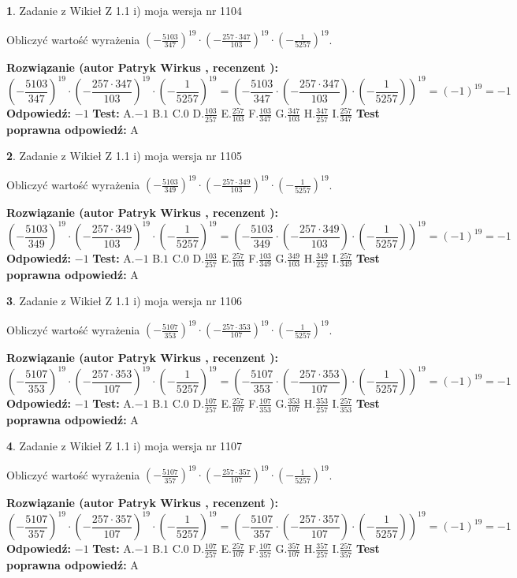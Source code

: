 \documentclass[12pt, a4paper]{article}
\theoremstyle{definition} %
\newtheorem{zad}{}
\newcommand{\zadStart}[1]{\begin{zad}#1\newline}
\newcommand{\zadStop}{\end{zad}}
\newcommand{\rozwStart}[2]{\noindent \textbf{Rozwiązanie (autor #1 , recenzent #2): }\newline}
\newcommand{\rozwStop}{\newline}
\newcommand{\odpStart}{\noindent \textbf{Odpowiedź:}\newline}
\newcommand{\odpStop}{\newline}
\newcommand{\testStart}{\noindent \textbf{Test:}\newline}
\newcommand{\testStop}{\newline}
\newcommand{\kluczStart}{\noindent \textbf{Test poprawna odpowiedź:}\newline}
\newcommand{\kluczStop}{\newline}
\begin{document}
\zadStart{Zadanie z Wikieł Z 1.1 i) moja wersja nr 1104}

Obliczyć wartość wyrażenia $(-\frac{5103}{347})^{19} \cdot (-\frac{257 \cdot 347}{103})^{19} \cdot (-\frac{1}{5257})^{19}$.
\zadStop
\rozwStart{Patryk Wirkus}{}
$$(-\frac{5103}{347})^{19} \cdot (-\frac{257 \cdot 347}{103})^{19} \cdot (-\frac{1}{5257})^{19} = (-\frac{5103}{347} \cdot (-\frac{257 \cdot 347}{103}) \cdot (-\frac{1}{5257}))^{19} = (-1)^{19} = -1$$
\rozwStop
\odpStart
$-1$
\odpStop
\testStart
A.$-1$ B.$1$ C.$0$ D.$\frac{103}{257}$ E.$\frac{257}{103}$
F.$\frac{103}{347}$ G.$\frac{347}{103}$
H.$\frac{347}{257}$
I.$\frac{257}{347}$
\testStop
\kluczStart
A
\kluczStop



\zadStart{Zadanie z Wikieł Z 1.1 i) moja wersja nr 1105}

Obliczyć wartość wyrażenia $(-\frac{5103}{349})^{19} \cdot (-\frac{257 \cdot 349}{103})^{19} \cdot (-\frac{1}{5257})^{19}$.
\zadStop
\rozwStart{Patryk Wirkus}{}
$$(-\frac{5103}{349})^{19} \cdot (-\frac{257 \cdot 349}{103})^{19} \cdot (-\frac{1}{5257})^{19} = (-\frac{5103}{349} \cdot (-\frac{257 \cdot 349}{103}) \cdot (-\frac{1}{5257}))^{19} = (-1)^{19} = -1$$
\rozwStop
\odpStart
$-1$
\odpStop
\testStart
A.$-1$ B.$1$ C.$0$ D.$\frac{103}{257}$ E.$\frac{257}{103}$
F.$\frac{103}{349}$ G.$\frac{349}{103}$
H.$\frac{349}{257}$
I.$\frac{257}{349}$
\testStop
\kluczStart
A
\kluczStop



\zadStart{Zadanie z Wikieł Z 1.1 i) moja wersja nr 1106}

Obliczyć wartość wyrażenia $(-\frac{5107}{353})^{19} \cdot (-\frac{257 \cdot 353}{107})^{19} \cdot (-\frac{1}{5257})^{19}$.
\zadStop
\rozwStart{Patryk Wirkus}{}
$$(-\frac{5107}{353})^{19} \cdot (-\frac{257 \cdot 353}{107})^{19} \cdot (-\frac{1}{5257})^{19} = (-\frac{5107}{353} \cdot (-\frac{257 \cdot 353}{107}) \cdot (-\frac{1}{5257}))^{19} = (-1)^{19} = -1$$
\rozwStop
\odpStart
$-1$
\odpStop
\testStart
A.$-1$ B.$1$ C.$0$ D.$\frac{107}{257}$ E.$\frac{257}{107}$
F.$\frac{107}{353}$ G.$\frac{353}{107}$
H.$\frac{353}{257}$
I.$\frac{257}{353}$
\testStop
\kluczStart
A
\kluczStop



\zadStart{Zadanie z Wikieł Z 1.1 i) moja wersja nr 1107}

Obliczyć wartość wyrażenia $(-\frac{5107}{357})^{19} \cdot (-\frac{257 \cdot 357}{107})^{19} \cdot (-\frac{1}{5257})^{19}$.
\zadStop
\rozwStart{Patryk Wirkus}{}
$$(-\frac{5107}{357})^{19} \cdot (-\frac{257 \cdot 357}{107})^{19} \cdot (-\frac{1}{5257})^{19} = (-\frac{5107}{357} \cdot (-\frac{257 \cdot 357}{107}) \cdot (-\frac{1}{5257}))^{19} = (-1)^{19} = -1$$
\rozwStop
\odpStart
$-1$
\odpStop
\testStart
A.$-1$ B.$1$ C.$0$ D.$\frac{107}{257}$ E.$\frac{257}{107}$
F.$\frac{107}{357}$ G.$\frac{357}{107}$
H.$\frac{357}{257}$
I.$\frac{257}{357}$
\testStop
\kluczStart
A
\kluczStop
\end{document}
